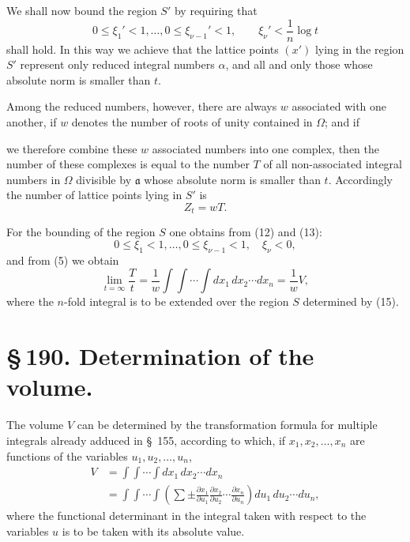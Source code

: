 \documentclass[11pt]{article}
\begin{document}
We shall now bound the region $S'$ by requiring that
\begin{equation}
0\leq\xi_1'<1,\ldots,
0\leq\xi_{\nu-1}'<1,
\qquad
\xi_\nu'<\frac1n\log t
\tag{13}
\end{equation}
shall hold. In this way we achieve that the lattice points $(x')$ lying in the region $S'$ represent only reduced integral numbers $\alpha$, and all and only those whose absolute norm is smaller than $t$.

Among the reduced numbers, however, there are always $w$ associated with one another, if $w$ denotes the number of roots of unity contained in $\Omega$; and if

we therefore combine these $w$ associated numbers into one complex, then the number of these complexes is equal to the number $T$ of all non-associated integral numbers in $\Omega$ divisible by $\mathfrak a$ whose absolute norm is smaller than $t$. Accordingly the number of lattice points lying in $S'$ is
\begin{equation}
Z_t=wT.
\tag{14}
\end{equation}

For the bounding of the region $S$ one obtains from (12) and (13):
\begin{equation}
0\leq\xi_1<1,\ldots,
0\leq\xi_{\nu-1}<1,
\quad \xi_\nu<0,
\tag{15}
\end{equation}
and from (5) we obtain
\begin{equation}
\lim_{t=\infty}\frac{T}{t}
=\frac1w\int\!\int\cdots\int dx_1\,dx_2\cdots dx_n
=\frac1w V,
\tag{16}
\end{equation}
where the $n$-fold integral is to be extended over the region $S$ determined by (15).

\section*{\S\,190. Determination of the volume.}

The volume $V$ can be determined by the transformation formula for multiple integrals already adduced in \S~155, according to which, if $x_1,x_2,\ldots,x_n$ are functions of the variables $u_1,u_2,\ldots,u_n$,
\begin{equation}
\begin{aligned}
V&=\int\!\int\cdots\int dx_1\,dx_2\cdots dx_n\\
&=\int\!\int\cdots\int\left(\sum\pm
\frac{\partial x_1}{\partial u_1}
\frac{\partial x_2}{\partial u_2}\cdots
\frac{\partial x_n}{\partial u_n}\right)du_1\,du_2\cdots du_n,
\end{aligned}
\tag{1}
\end{equation}
where the functional determinant in the integral taken with respect to the variables $u$ is to be taken with its absolute value.
\end{document}
